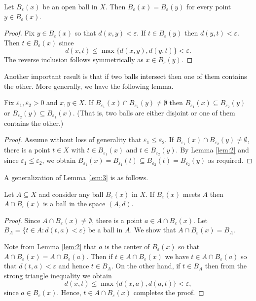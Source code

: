 \begin{lemma}
\label{lem:2}
Let \( B_{\varepsilon } (x) \) be an open ball in \( X \). Then \( B_{\varepsilon } (x) = B_{\varepsilon } (y) \) for every point \( y \in B_{\varepsilon } (x) \).
\end{lemma}
\begin{proof}
Fix \( y \in B_{\varepsilon } (x) \) so that \( d(x,y) < \varepsilon  \). If \( t \in B_{\varepsilon } (y) \) then \( d(y,t) < \varepsilon  \). Then \( t \in B_{\varepsilon } (x) \) since \[ d(x, t) \leq \max \{ d(x,y), d(y,t) \} < \varepsilon . \] The reverse inclusion follows symmetrically as \( x \in B_{\varepsilon } (y) \).
\end{proof}
Another important result is that if two balls intersect then one of them contains the other. More generally, we have the following lemma.
\begin{lemma}
\label{lem:3}
Fix \( \varepsilon_1, \varepsilon_2 > 0 \) and \( x, y \in X \). If \( B_{\varepsilon_1} (x) \cap B_{\varepsilon_2}(y) \neq \emptyset  \) then \( B_{\varepsilon_1} (x) \subseteq B_{\varepsilon_2} (y) \) or \( B_{\varepsilon_{2} }(y) \subseteq B_{\varepsilon_1} (x)  \). (That is, two balls are either disjoint or one of them contains the other.)
\end{lemma}
\begin{proof}
	Assume without loss of generality that \( \varepsilon_1 \leq \varepsilon_2 \). If \( B_{\varepsilon_1} (x) \cap B_{\varepsilon_2} (y) \neq \emptyset \), there is a point \( t \in X \) with \( t \in B_{\varepsilon_1}(x) \) and \( t \in  B_{\varepsilon_2} (y)  \). By Lemma \ref{lem:2} and since \( \varepsilon_1 \leq \varepsilon_2 \), we obtain \( B_{\varepsilon_1} (x) = B_{\varepsilon_1} (t) \subseteq B_{\varepsilon_2} (t) = B_{\varepsilon_2} (y) \) as required.
\end{proof}
A generalization of Lemma \ref{lem:3} is as follows.
\begin{lemma}
\label{lem:4}
Let \( A \subseteq X \) and consider any ball \(B_{\varepsilon } (x) \) in \( X \). If \( B_{\varepsilon } (x) \) meets \( A \) then \( A \cap B_{\varepsilon } (x) \) is a ball in the space \( (A, d) \).
\end{lemma}
\begin{proof}
Since \( A \cap B_{\varepsilon } (x) \neq \emptyset  \), there is a point \( a \in A \cap B_{\varepsilon } (x) \). Let \( B_{A} = \{ t \in A : d(t,a) < \varepsilon  \}  \) be a ball in \( A \). We show that \( A \cap B_{\varepsilon } (x) = B_{A}  \).

Note from Lemma \ref{lem:2} that \( a \) is the center of \( B_{\varepsilon } (x) \) so that \( A \cap B_{\varepsilon } (x) = A \cap B_{\varepsilon } (a) \). Then if \( t \in A \cap B_{\varepsilon } (x) \) we have \( t \in A \cap B_{\varepsilon } (a) \) so that \( d(t, a) < \varepsilon  \) and hence \( t \in B_{A} \). On the other hand, if \( t \in B_{A}  \) then from the strong triangle inequality we obtain \[ d(x, t) \leq \max \{ d(x,a), d(a,t) \} < \varepsilon , \] since \( a \in B_{\varepsilon } (x) \). Hence, \( t \in A \cap B_{\varepsilon } (x) \) completes the proof.
\end{proof}
